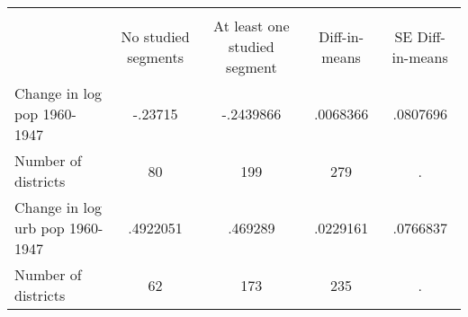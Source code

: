 \begin{tabular}{l*{4}{c}}
\hline\hline
            &\multicolumn{4}{c}{}                               \\
            &No studied segments&At least one studied segment&Diff-in-means&SE Diff-in-means\\
\hline
Change in log pop 1960-1947&     -.23715&   -.2439866&    .0068366&    .0807696\\
Number of districts&          80&         199&         279&           .\\
Change in log urb pop 1960-1947&    .4922051&     .469289&    .0229161&    .0766837\\
Number of districts&          62&         173&         235&           .\\
\hline\hline
\end{tabular}
